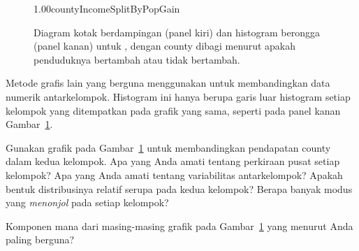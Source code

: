 \begin{figure}[!t]
      {1.00}{countyIncomeSplitByPopGain}
  \caption{Diagram kotak berdampingan (panel kiri)
      dan histogram berongga (panel kanan) untuk
      ,
      dengan county dibagi menurut apakah penduduknya
      bertambah atau tidak bertambah.}
  \label{countyIncomeSplitByPopGain}
\end{figure}

Metode grafis lain yang berguna menggunakan  untuk membandingkan data numerik antarkelompok. Histogram ini hanya berupa garis luar histogram setiap kelompok yang ditempatkan pada grafik yang sama, seperti pada panel kanan Gambar~\ref{countyIncomeSplitByPopGain}.

\begin{exercisewrap}
\begin{nexercise} \label{comparingPriceByTypeExercise}
Gunakan grafik pada Gambar~\ref{countyIncomeSplitByPopGain}
untuk membandingkan pendapatan county dalam kedua kelompok.
Apa yang Anda amati tentang perkiraan pusat setiap kelompok?
Apa yang Anda amati tentang variabilitas antarkelompok?
Apakah bentuk distribusinya relatif serupa pada kedua kelompok?
Berapa banyak modus yang \emph{menonjol} pada setiap
kelompok?\footnotemark{}
\end{nexercise}
\end{exercisewrap}

\begin{exercisewrap}
\begin{nexercise}
Komponen mana dari masing-masing grafik pada
Gambar~\ref{countyIncomeSplitByPopGain}
yang menurut Anda paling berguna?\footnotemark{}
\end{nexercise}
\end{exercisewrap}



